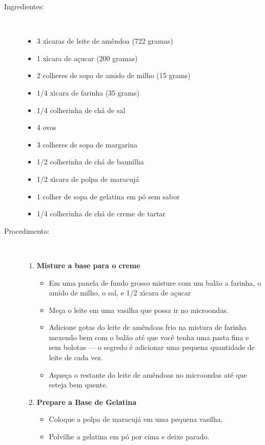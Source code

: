 \documentclass [11pt, letterpaper] {article}
\begin{document}
\vspace{0.3in}
\begin{description}

\item[Ingredientes:]\ \\
	\begin{itemize}
	\item 3 x\'{\i}caras de leite de am\^endoa  (722 gramas)
	\item 1 x\'{\i}cara de a\c{c}ucar (200 gramas)
	\item 2 colheres de sopa de amido de milho (15 grams)
	\item 1/4 x\'{\i}cara de farinha (35 grams)
	\item 1/4 colherinha de ch\'a de sal
	\item 4 ovos
	\item 3 colheres de sopa de margarina
	\item 1/2 colherinha de ch\'a de baunilha 
	\item 1/2 x\'{\i}cara de polpa de maracuj\'a
	\item 1 colher de sopa de gelatina em p\'o sem sabor
	\item 1/4 colherinha de ch\'a de creme de tartar
	\end{itemize}

\item[Procedimento:]\ \\
	\begin{enumerate}
	\item {\bf Misture a base para o creme}
	\begin{itemize}
	\item Em uma panela de fundo grosso misture com um bal\~ao a farinha, o amido de milho, o sal, e 1/2 x\'{\i}cara de a\c{c}ucar 
	\item Me\c{c}a o leite em uma vasilha que possa ir no microondas.
	\item Adicione gotas do leite de am\^endoas frio na mistura de farinha mexendo bem com o bal\~ao at\'e que voc\^e tenha uma pasta fina e sem bolotas --- o segredo \'e adicionar uma pequena quantidade de leite de cada vez.
	\item Aque\c{c}a o restante do leite de am\^endoas no microondas at\'e que esteja bem quente.
	\end{itemize}
	
	\item {\bf Prepare a Base de Gelatina}
	\begin{itemize}
	\item Coloque a polpa de maracuj\'a em uma pequena vasilha.
	\item Polvilhe a gelatina em p\'o por cima e deixe parado.
	\end{itemize}


\end{enumerate}
\end{description}
\end{document}
